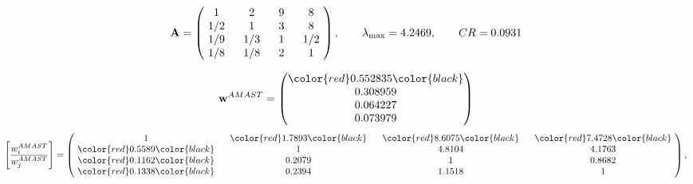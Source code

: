 \begin{example}
\begin{equation*}
\mathbf{A} =
\begin{pmatrix}
$\,\,$ 1 $\,\,$ & $\,\,$2$\,\,$ & $\,\,$9$\,\,$ & $\,\,$8 $\,\,$ \\
$\,\,$ 1/2$\,\,$ & $\,\,$ 1 $\,\,$ & $\,\,$3$\,\,$ & $\,\,$8 $\,\,$ \\
$\,\,$ 1/9$\,\,$ & $\,\,$ 1/3$\,\,$ & $\,\,$ 1 $\,\,$ & $\,\,$ 1/2 $\,\,$ \\
$\,\,$ 1/8$\,\,$ & $\,\,$ 1/8$\,\,$ & $\,\,$2$\,\,$ & $\,\,$ 1  $\,\,$ \\
\end{pmatrix},
\qquad
\lambda_{\max} =
4.2469,
\qquad
CR = 0.0931
\end{equation*}

\begin{equation*}
\mathbf{w}^{AMAST} =
\begin{pmatrix}
\color{red} 0.552835\color{black} \\
0.308959\\
0.064227\\
0.073979
\end{pmatrix}\end{equation*}
\begin{equation*}
\left[ \frac{{w}^{AMAST}_i}{{w}^{AMAST}_j} \right] =
\begin{pmatrix}
$\,\,$ 1 $\,\,$ & $\,\,$\color{red} 1.7893\color{black} $\,\,$ & $\,\,$\color{red} 8.6075\color{black} $\,\,$ & $\,\,$\color{red} 7.4728\color{black} $\,\,$ \\
$\,\,$\color{red} 0.5589\color{black} $\,\,$ & $\,\,$ 1 $\,\,$ & $\,\,$4.8104$\,\,$ & $\,\,$4.1763  $\,\,$ \\
$\,\,$\color{red} 0.1162\color{black} $\,\,$ & $\,\,$0.2079$\,\,$ & $\,\,$ 1 $\,\,$ & $\,\,$0.8682 $\,\,$ \\
$\,\,$\color{red} 0.1338\color{black} $\,\,$ & $\,\,$0.2394$\,\,$ & $\,\,$1.1518$\,\,$ & $\,\,$ 1  $\,\,$ \\
\end{pmatrix},
\end{equation*}


\end{example}
